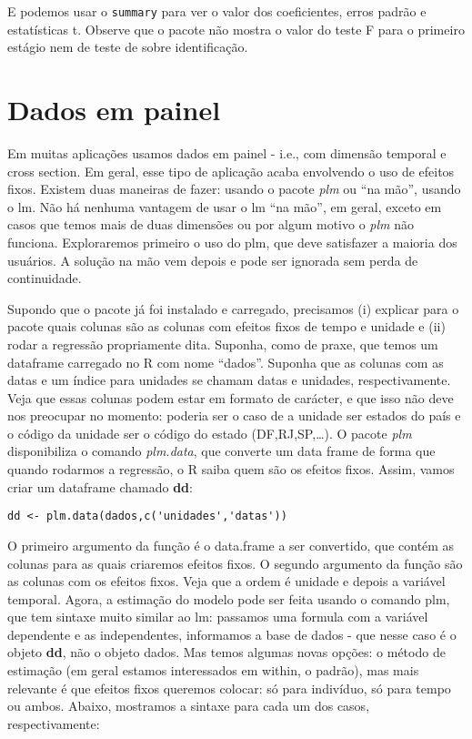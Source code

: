 \documentclass[]{book}
\begin{document}
E podemos usar o \texttt{summary} para ver o valor dos coeficientes,
erros padrão e estatísticas t. Observe que o pacote não mostra o valor
do teste F para o primeiro estágio nem de teste de sobre identificação.

\section{Dados em painel}\label{dados-em-painel}

Em muitas aplicações usamos dados em painel - i.e., com dimensão
temporal e cross section. Em geral, esse tipo de aplicação acaba
envolvendo o uso de efeitos fixos. Existem duas maneiras de fazer:
usando o pacote \emph{plm} ou ``na mão'', usando o lm. Não há nenhuma
vantagem de usar o lm ``na mão'', em geral, exceto em casos que temos
mais de duas dimensões ou por algum motivo o \emph{plm} não funciona.
Exploraremos primeiro o uso do plm, que deve satisfazer a maioria dos
usuários. A solução na mão vem depois e pode ser ignorada sem perda de
continuidade.

Supondo que o pacote já foi instalado e carregado, precisamos (i)
explicar para o pacote quais colunas são as colunas com efeitos fixos de
tempo e unidade e (ii) rodar a regressão propriamente dita. Suponha,
como de praxe, que temos um dataframe carregado no R com nome ``dados''.
Suponha que as colunas com as datas e um índice para unidades se chamam
datas e unidades, respectivamente. Veja que essas colunas podem estar em
formato de carácter, e que isso não deve nos preocupar no momento:
poderia ser o caso de a unidade ser estados do país e o código da
unidade ser o código do estado (DF,RJ,SP,\ldots{}). O pacote \emph{plm}
disponibiliza o comando \emph{plm.data}, que converte um data frame de
forma que quando rodarmos a regressão, o R saiba quem são os efeitos
fixos. Assim, vamos criar um dataframe chamado \textbf{dd}:

\begin{verbatim}
dd <- plm.data(dados,c('unidades','datas'))
\end{verbatim}

O primeiro argumento da função é o data.frame a ser convertido, que
contém as colunas para as quais criaremos efeitos fixos. O segundo
argumento da função são as colunas com os efeitos fixos. Veja que a
ordem é unidade e depois a variável temporal. Agora, a estimação do
modelo pode ser feita usando o comando plm, que tem sintaxe muito
similar ao lm: passamos uma formula com a variável dependente e as
independentes, informamos a base de dados - que nesse caso é o objeto
\textbf{dd}, não o objeto dados. Mas temos algumas novas opções: o
método de estimação (em geral estamos interessados em within, o padrão),
mas mais relevante é que efeitos fixos queremos colocar: só para
indivíduo, só para tempo ou ambos. Abaixo, mostramos a sintaxe para cada
um dos casos, respectivamente:
\end{document}
